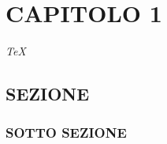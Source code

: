 \chapter{CAPITOLO 1} \label{Cap.1}

\vspace{2cm}

\begin{flushright}
\textit{TeX}
\end{flushright}

\vspace{0.5cm}


\section{SEZIONE}\label{sottosezione}


\subsection{SOTTO SEZIONE}

